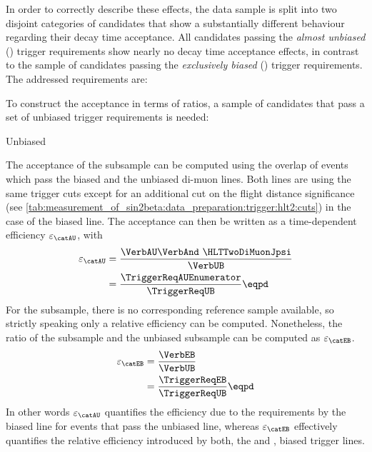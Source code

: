 In order to correctly describe these effects, the data sample is split into two
disjoint categories of candidates that show a substantially different behaviour
regarding their decay time acceptance. All candidates passing the \emph{almost
unbiased} (\textbf{\catAU}) trigger requirements show nearly no decay time
acceptance effects, in contrast to the sample of candidates passing the
\emph{exclusively biased} (\textbf{\catEB}) trigger requirements. The addressed
requirements are:
%
\begin{description}
  \item[\catAU] \TriggerReqAU
  \item[\catEB] \TriggerReqEB
\end{description}
%
To construct the acceptance in terms of ratios, a sample of candidates that pass
a set of unbiased trigger requirements is needed:
%
\begin{description}
  \item[Unbiased] \TriggerReqUB
\end{description}
%
The acceptance of the \catAU subsample can be computed using the overlap of
events which pass the biased and the unbiased \HLTTwo di-muon lines. Both
lines are using the same trigger cuts except for an additional cut on the flight
distance significance (see
\cref{tab:measurement_of_sin2beta:data_preparation:trigger:hlt2:cuts}) in the
case of the biased line. The acceptance can then be written as a time-dependent
efficiency $\varepsilon_\text{\catAU}$, with
%
\begin{align}
    \varepsilon_\text{\catAU} &= \frac{\text{\VerbAU\VerbAnd \HLTTwoDiMuonJpsi}}{\text{\VerbUB}}\\
                              &= \frac{\text{\TriggerReqAUEnumerator}}{\text{\TriggerReqUB}}\eqpd \nonumber
\end{align} 
%
For the \catEB subsample, there is no corresponding reference sample available,
so strictly speaking only a relative efficiency can be computed. Nonetheless,
the ratio of the \catEB subsample and the unbiased subsample can be computed as
$\varepsilon_\text{\catEB}$.
%
\begin{align}
    \varepsilon_\text{\catEB} &= \frac{\text{\VerbEB}}{\text{\VerbUB}}\\
                              &= \frac{\text{\TriggerReqEB}}{\text{\TriggerReqUB}}\eqpd \nonumber
\end{align}
%
In other words $\varepsilon_\text{\catAU}$ quantifies the efficiency due to the
requirements by the biased \HLTTwo line for events that pass the unbiased
\HLTOne line, whereas $\varepsilon_\text{\catEB}$ effectively quantifies the
relative efficiency introduced by both, the \HLTOne and \HLTTwo, biased trigger
lines.

